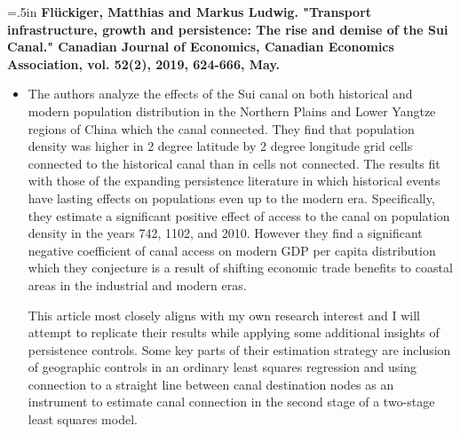 \documentclass[11pt]{article}
\begin{document}
\hangindent=.5in
\textbf{Flückiger, Matthias and Markus Ludwig. "Transport infrastructure, growth and persistence: The rise and demise of the Sui Canal." Canadian Journal of Economics, Canadian Economics Association, vol. 52(2), 2019, 624-666, May.}
\begin{itemize}
    \item[~] 
    The authors analyze the effects of the Sui canal on both historical and modern population distribution in the Northern Plains and Lower Yangtze regions of China which the canal connected. They find that population density was higher in 2 degree latitude by 2 degree longitude grid cells connected to the historical canal than in cells not connected. The results fit with those of the expanding persistence literature in which historical events have lasting effects on populations even up to the modern era. Specifically, they estimate a significant positive effect of access to the canal on population density in the years 742, 1102, and 2010. However they find a significant negative coefficient of canal access on modern GDP per capita distribution which they conjecture is a result of shifting economic trade benefits to coastal areas in the industrial and modern eras. 
    
    This article most closely aligns with my own research interest and I will attempt to replicate their results while applying some additional insights of persistence controls. Some key parts of their estimation strategy are inclusion of geographic controls in an ordinary least squares regression and using connection to a straight line between canal destination nodes as an instrument to estimate canal connection in the second stage of a two-stage least squares model. 
\end{itemize}
\end{document}
